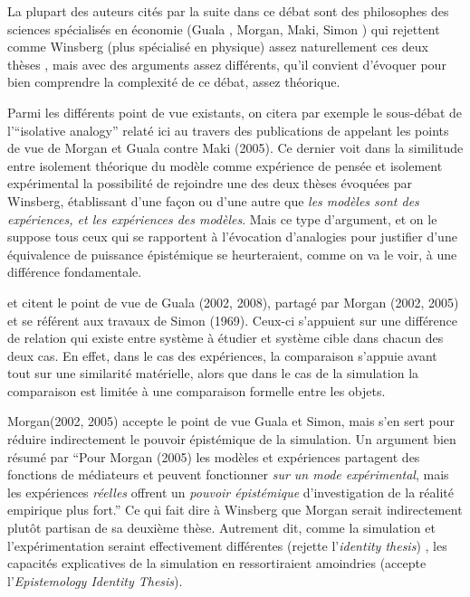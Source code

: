 La plupart des auteurs cités par la suite dans ce débat sont des philosophes des sciences spécialisés en économie (Guala , Morgan, Maki, Simon ) qui rejettent comme Winsberg (plus spécialisé en physique) assez naturellement ces deux thèses \autocite{Winsberg2009}, mais avec des arguments assez différents, qu'il convient d'évoquer pour bien comprendre la complexité de ce débat, assez théorique.

Parmi les différents point de vue existants, on citera par exemple le sous-débat de l'\foreignquote{english}{isolative analogy} relaté ici au travers des publications de \textcite{Phan2008, Phan2010} appelant les points de vue de Morgan et Guala contre Maki (2005). Ce dernier voit dans la similitude entre isolement théorique du modèle comme expérience de pensée et isolement expérimental la possibilité de rejoindre une des deux thèses évoquées par Winsberg, établissant d'une façon ou d'une autre que \textit{les modèles sont des expériences, et les expériences des modèles}. Mais ce type d'argument, et on le suppose tous ceux qui se rapportent à l'évocation d'analogies pour justifier d'une équivalence de puissance épistémique se heurteraient, comme on va le voir, à une différence fondamentale.

\textcite{Phan2010} et \textcite{Winsberg2013} citent le point de vue de Guala (2002, 2008), partagé par Morgan (2002, 2005) et se référent aux travaux de Simon (1969). Ceux-ci s'appuient sur une différence de relation qui existe entre système à étudier et système cible dans chacun des deux cas. En effet, dans le cas des expériences, la comparaison s'appuie avant tout sur une similarité matérielle, alors que dans le cas de la simulation la comparaison est limitée à une comparaison formelle entre les objets.

Morgan(2002, 2005) accepte le point de vue Guala et Simon, mais s'en sert pour réduire indirectement le pouvoir épistémique de la simulation. Un argument bien résumé par \textcite{Phan2008} \enquote{Pour Morgan (2005) les modèles et expériences partagent des fonctions de médiateurs et peuvent fonctionner \textit{sur un mode expérimental}, mais les expériences \textit{réelles} offrent un \textit{pouvoir épistémique} d'investigation de la réalité empirique plus fort.}  Ce qui fait dire à Winsberg que Morgan serait indirectement plutôt partisan de sa deuxième thèse. Autrement dit, comme la simulation et l'expérimentation seraint effectivement différentes (rejette l'\textit{identity thesis}) , les capacités explicatives de la simulation en ressortiraient amoindries (accepte l'\textit{Epistemology Identity Thesis}).

